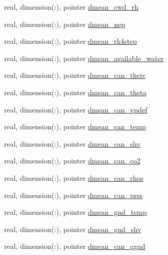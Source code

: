\begin{DoxyCompactItemize}
\item 
real, dimension(\+:), pointer \hyperlink{structed__state__vars_1_1sitetype_a8aee07d8252c9159456c0e99a02ac704}{dmean\+\_\+cwd\+\_\+rh}
\item 
real, dimension(\+:), pointer \hyperlink{structed__state__vars_1_1sitetype_a6460ca8d4f8ab096393eb0f52b3a2f59}{dmean\+\_\+nep}
\item 
real, dimension(\+:), pointer \hyperlink{structed__state__vars_1_1sitetype_a2944b67488c52b562733b61fba6f848d}{dmean\+\_\+rk4step}
\item 
real, dimension(\+:), pointer \hyperlink{structed__state__vars_1_1sitetype_ab766775694132052d7ce782f9b77e44d}{dmean\+\_\+available\+\_\+water}
\item 
real, dimension(\+:), pointer \hyperlink{structed__state__vars_1_1sitetype_a19dbf3903d2dca4023d9f45f3289f221}{dmean\+\_\+can\+\_\+theiv}
\item 
real, dimension(\+:), pointer \hyperlink{structed__state__vars_1_1sitetype_a6ee4cb0d4305517ebef071c0db2fb624}{dmean\+\_\+can\+\_\+theta}
\item 
real, dimension(\+:), pointer \hyperlink{structed__state__vars_1_1sitetype_aa7792760f90f1c4404b870a869c63c4f}{dmean\+\_\+can\+\_\+vpdef}
\item 
real, dimension(\+:), pointer \hyperlink{structed__state__vars_1_1sitetype_a6b6e7ec3efbec7f0838c14b557b4dba4}{dmean\+\_\+can\+\_\+temp}
\item 
real, dimension(\+:), pointer \hyperlink{structed__state__vars_1_1sitetype_a807487103ec1fc963d4c882ee57ec540}{dmean\+\_\+can\+\_\+shv}
\item 
real, dimension(\+:), pointer \hyperlink{structed__state__vars_1_1sitetype_a687f4304aaa1b0b41087d8eea7268d99}{dmean\+\_\+can\+\_\+co2}
\item 
real, dimension(\+:), pointer \hyperlink{structed__state__vars_1_1sitetype_ad6cf9b2b3a04a9611020d822c559be10}{dmean\+\_\+can\+\_\+rhos}
\item 
real, dimension(\+:), pointer \hyperlink{structed__state__vars_1_1sitetype_ac493fd71f9196145e0cb7917c8cba862}{dmean\+\_\+can\+\_\+prss}
\item 
real, dimension(\+:), pointer \hyperlink{structed__state__vars_1_1sitetype_a4ea5fb9f0c467abe363cd934f2ef4a39}{dmean\+\_\+gnd\+\_\+temp}
\item 
real, dimension(\+:), pointer \hyperlink{structed__state__vars_1_1sitetype_ae9a5ca38511ca53c834dba5b513ce40c}{dmean\+\_\+gnd\+\_\+shv}
\item 
real, dimension(\+:), pointer \hyperlink{structed__state__vars_1_1sitetype_a50499eeb29f3f5dbc3c80315ac5c6c76}{dmean\+\_\+can\+\_\+ggnd}

\end{DoxyCompactItemize}
